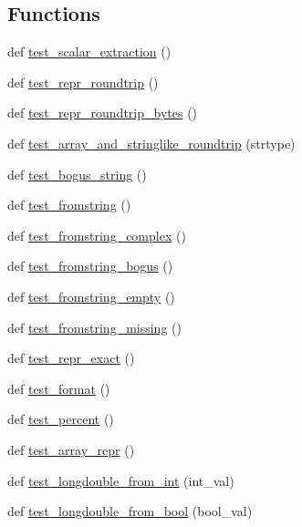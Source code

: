 \subsection*{Functions}
\begin{DoxyCompactItemize}
\item 
def \hyperlink{namespacenumpy_1_1core_1_1tests_1_1test__longdouble_a5b0468739aebcdff8f65c8b322484970}{test\+\_\+scalar\+\_\+extraction} ()
\item 
def \hyperlink{namespacenumpy_1_1core_1_1tests_1_1test__longdouble_af70651eb2b775243026769e23a53ff7b}{test\+\_\+repr\+\_\+roundtrip} ()
\item 
def \hyperlink{namespacenumpy_1_1core_1_1tests_1_1test__longdouble_a353f18d0a6f7d1bafd44a246f6d3fae0}{test\+\_\+repr\+\_\+roundtrip\+\_\+bytes} ()
\item 
def \hyperlink{namespacenumpy_1_1core_1_1tests_1_1test__longdouble_a58082952834ac1f153012cd13af6c6a7}{test\+\_\+array\+\_\+and\+\_\+stringlike\+\_\+roundtrip} (strtype)
\item 
def \hyperlink{namespacenumpy_1_1core_1_1tests_1_1test__longdouble_a60813942dd53a03cbe9b4699d5ce3457}{test\+\_\+bogus\+\_\+string} ()
\item 
def \hyperlink{namespacenumpy_1_1core_1_1tests_1_1test__longdouble_a10b45353ebbe0941dbbb9dcf41cb0d3d}{test\+\_\+fromstring} ()
\item 
def \hyperlink{namespacenumpy_1_1core_1_1tests_1_1test__longdouble_abd9eb0847a6f9a66be3eb1aefed87108}{test\+\_\+fromstring\+\_\+complex} ()
\item 
def \hyperlink{namespacenumpy_1_1core_1_1tests_1_1test__longdouble_a7933d8ed7e63fa86286bcd46819b6b4f}{test\+\_\+fromstring\+\_\+bogus} ()
\item 
def \hyperlink{namespacenumpy_1_1core_1_1tests_1_1test__longdouble_a30d224740a4e84803dd2b3982c38b797}{test\+\_\+fromstring\+\_\+empty} ()
\item 
def \hyperlink{namespacenumpy_1_1core_1_1tests_1_1test__longdouble_a0acbcac4b2372e13b5c470c66b68563c}{test\+\_\+fromstring\+\_\+missing} ()
\item 
def \hyperlink{namespacenumpy_1_1core_1_1tests_1_1test__longdouble_af1bbbddcda7e0206fcc0de7834ed3306}{test\+\_\+repr\+\_\+exact} ()
\item 
def \hyperlink{namespacenumpy_1_1core_1_1tests_1_1test__longdouble_a7a602ee2c38e245cb8ae32d325d61c5a}{test\+\_\+format} ()
\item 
def \hyperlink{namespacenumpy_1_1core_1_1tests_1_1test__longdouble_aae618c682f6f3cd783c5d50115d5274c}{test\+\_\+percent} ()
\item 
def \hyperlink{namespacenumpy_1_1core_1_1tests_1_1test__longdouble_ac1f19c7f80c3519a3ec2a0dd0ff4d876}{test\+\_\+array\+\_\+repr} ()
\item 
def \hyperlink{namespacenumpy_1_1core_1_1tests_1_1test__longdouble_ae07f0169fdc2f5892ccd4ba901668522}{test\+\_\+longdouble\+\_\+from\+\_\+int} (int\+\_\+val)
\item 
def \hyperlink{namespacenumpy_1_1core_1_1tests_1_1test__longdouble_a972afd860e8e668bb139cc7cab9e3cb3}{test\+\_\+longdouble\+\_\+from\+\_\+bool} (bool\+\_\+val)
\end{DoxyCompactItemize}
